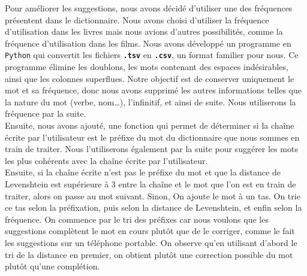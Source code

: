 \documentclass[a4paper, 11pt]{report}
\newcommand{\var}[1]{\texttt{\textbf{#1}}}
\newcommand{\langage}[1]{\texttt{#1}}
\begin{document}
{Pour améliorer les suggestions, nous avons décidé d'utiliser une des fréquences présentent dans le dictionnaire. Nous avons choisi d'utiliser la fréquence d'utilisation dans les livres mais nous avions d'autres possibilités, comme la fréquence d'utilisation dans les films. Nous avons développé un programme en \langage{Python} qui convertit les fichiers \var{.tsv} en \var{.csv}, un format familier pour nous. Ce programme élimine les doublons, les mots contenant des espaces indésirables, ainsi que les colonnes superflues. Notre objectif est de conserver uniquement le mot et sa fréquence, donc nous avons supprimé les autres informations telles que la nature du mot (verbe, nom\dots), l'infinitif, et ainsi de suite. Nous utiliserons la fréquence par la suite. \\

Ensuite, nous avons ajouté, une fonction qui permet de déterminer si la chaîne écrite par l'utilisateur est le préfixe du mot du dictionnaire que nous sommes en train de traiter. Nous l'utiliserons également par la suite pour suggérer les mots les plus cohérents avec la chaîne écrite par l'utilisateur.\\

Ensuite, si la chaîne écrite n'est pas le préfixe du mot et que la distance de Levenshtein est supérieure à 3 entre la chaîne et le mot que l'on est en train de traiter, alors on passe au mot suivant. Sinon, On ajoute le mot à un tas. On trie ce tas selon la préfixation, puis selon la distance de Levenshtein, et enfin selon la fréquence. On commence par le tri des préfixes car nous voulons que les suggestions complètent le mot en cours plutôt que de le corriger, comme le fait les suggestions sur un téléphone portable. On observe qu'en utilisant d'abord le tri de la distance en premier, on obtient plutôt une correction possible du mot plutôt qu'une complétion.\\

}
\end{document}

